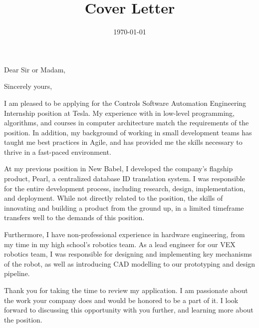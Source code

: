 \documentclass[11pt, letterpaper, sans]{moderncv}
\title{Cover Letter}
\begin{document}
\clearpage

\newcommand{\positionname}{Controls Software Automation Engineering Internship} %
\newcommand{\companyname}{Tesla} %

\recipient{HR Department}{\companyname{}} %
\date{\today} %
\opening{Dear Sir or Madam,} %
\closing{Sincerely yours,} %

\makelettertitle %

I am pleased to be applying for the \positionname{} position at \companyname{}.
My experience with in low-level programming,
algorithms,
and courses in computer architecture match the requirements of the position.
In addition, my background of working in small development teams
has taught me best practices in Agile,
and has provided me the skills necessary to thrive in a fast-paced environment.

At my previous position in New Babel,
I developed the company's flagship product, Pearl, a centralized database ID translation system.
I was responsible for the entire development process,
including research, design, implementation, and deployment.
While not directly related to the position,
the skills of innovating and building a product from the ground up,
in a limited timeframe transfers well to the demands of this position.

Furthermore, I have non-professional experience in hardware engineering,
from my time in my high school's robotics team.
As a lead engineer for our VEX robotics team,
I was responsible for designing and implementing
key mechanisms of the robot,
as well as introducing CAD modelling to our prototyping and design pipeline.

Thank you for taking the time to review my application.
I am passionate about the work your company does and would be honored to be a part of it.
I look forward to discussing this opportunity with you further,
and learning more about the position.

\makeletterclosing %

\newpage
\end{document}
